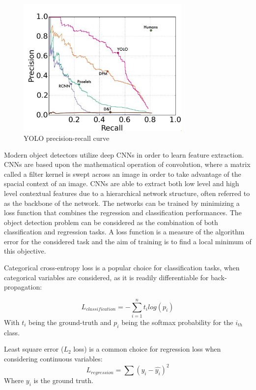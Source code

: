 \documentclass[a4paper,twoside,12pt]{report}
\begin{document}
\begin{figure}[h!]
\begin{center}
\includegraphics[width=8.5cm]{images/yoloplot.jpg}
\caption{YOLO precision-recall curve \citep{yolo}}
\label{fig:yoloplot}
\end{center}
\end{figure}

Modern object detectors utilize deep CNNs in order to learn feature extraction. CNNs are based upon the mathematical operation of convolution, where a matrix called a filter kernel is swept across an image in order to take advantage of the spacial context of an image. CNNs are able to extract both low level and high level contextual features due to a hierarchical network structure, often referred to as the backbone of the network. The networks can be trained by minimizing a loss function that combines the regression and classification performances. The object detection problem can be considered as the combination of both classification and regression tasks. A loss function is a measure of the algorithm error for the considered task and the aim of training is to find a local minimum of this objective. 

Categorical cross-entropy loss is a popular choice for classification tasks, when categorical variables are considered, as it is readily differentiable for back-propagation:

\begin{equation}
L_{classification} = -\sum_{i=1}^{n}t_i log(p_i)
\end{equation} 
With $t_i$ being the ground-truth and $p_i$ being the softmax probability for the $i_{th}$ class.

Least square error ($L_2$ loss) is a common choice for regression loss when considering continuous variables:
\begin{equation}
L_{regression} = \sum(y_i-\hat{y_i})^2 
\end{equation} 
Where $y_i$ is the ground truth.
\end{document}
